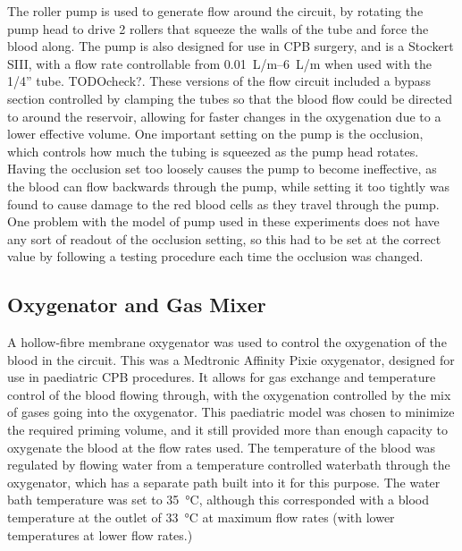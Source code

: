 The roller pump is used to generate flow around the circuit, by rotating the pump head to drive 2 rollers that squeeze the walls of the tube and force the blood along.
The pump is also designed for use in CPB surgery, and is a Stockert SIII, with a flow rate controllable from \SIrange{0.01}{6}{L/m} when used with the 1/4'' tube. TODOcheck?.
These versions of the flow circuit included a bypass section controlled by clamping the tubes so that the blood flow could be directed to around the reservoir, allowing for faster changes in the oxygenation due to a lower effective volume.
One important setting on the pump is the occlusion, which controls how much the tubing is squeezed as the pump head rotates.
Having the occlusion set too loosely causes the pump to become ineffective, as the blood can flow backwards through the pump, while setting it too tightly was found to cause damage to the red blood cells as they travel through the pump.
One problem with the model of pump used in these experiments does not have any sort of readout of the occlusion setting, so this had to be set at the correct value by following a testing procedure each time the occlusion was changed.

\subsection{Oxygenator and Gas Mixer}
A hollow-fibre membrane oxygenator was used to control the oxygenation of the blood in the circuit.
This was a Medtronic Affinity Pixie oxygenator, designed for use in paediatric CPB procedures.
It allows for gas exchange and temperature control of the blood flowing through, with the oxygenation controlled by the mix of gases going into the oxygenator.
This paediatric model was chosen to minimize the required priming volume, and it still provided more than enough capacity to oxygenate the blood at the flow rates used.
The temperature of the blood was regulated by flowing water from a temperature controlled waterbath through the oxygenator, which has a separate path built into it for this purpose.
The water bath temperature was set to \SI{35}{\degreeCelsius}, although this corresponded with a blood temperature at the outlet of \SI{33}{\degreeCelsius} at maximum flow rates (with lower temperatures at lower flow rates.)


